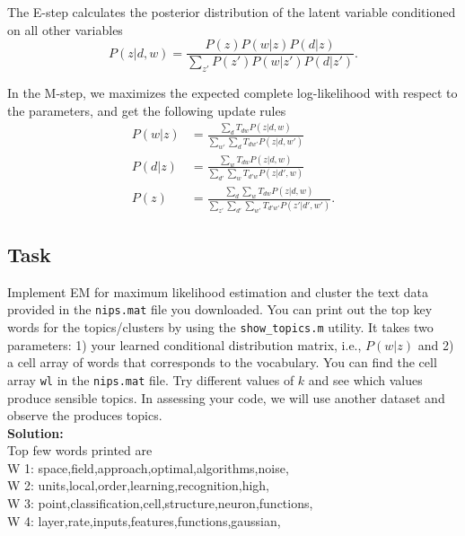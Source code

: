 \documentclass[twoside,10pt]{article}
\begin{document}
The E-step calculates the posterior distribution of the latent variable conditioned on all other variables
\begin{equation}
P(z|d, w) = \frac{P(z) P(w|z) P(d|z)}{\sum_{z'}P(z') P(w|z') P(d|z')}.
\end{equation}

In the M-step, we maximizes the expected complete log-likelihood with respect to the parameters, and get the following update rules
\begin{align}
P(w|z) &= \frac{\sum_{d} T_{dw} P(z|d,w)}{\sum_{w'}\sum_{d} T_{dw'} P(z|d,w')} \\
P(d|z) &=  \frac{\sum_{w} T_{dw} P(z|d,w)}{\sum_{d'}\sum_{w} T_{d'w} P(z|d',w)} \\
P(z) &= \frac{\sum_{d}\sum_{w} T_{dw} P(z|d,w)}{\sum_{z'}\sum_{d'}\sum_{w'} T_{d'w'} P(z'|d',w')} .
\end{align}

\subsection*{Task}
 Implement EM for maximum likelihood estimation and cluster the
text data provided in the \texttt{nips.mat} file you downloaded. You can print out the top key words for the topics/clusters 
by using the \texttt{show\_topics.m} utility. It takes two parameters: 1) your learned conditional distribution matrix, i.e., $P(w|z)$ and
2) a cell array of words that corresponds to the vocabulary. You can find the cell array \texttt{wl} in the \texttt{nips.mat} file.
Try different values of $k$ and see which values produce sensible topics. In assessing your code, we will use another dataset and 
observe the produces topics.\\
\textbf{ Solution: } \\
Top few words printed are \\
W 1: space,field,approach,optimal,algorithms,noise,\\
W 2: units,local,order,learning,recognition,high,\\
W 3: point,classification,cell,structure,neuron,functions,\\
W 4: layer,rate,inputs,features,functions,gaussian,\\
%
%
\end{document}
